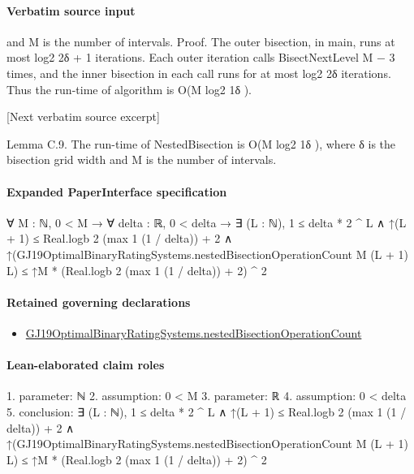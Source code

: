 \documentclass[10pt]{article}
\begin{document}
\paragraph{Verbatim source input}
\begin{ReviewVerbatim}
and M is the number of intervals.
Proof. The outer bisection, in main, runs at most log2 2δ + 1 iterations. Each outer iteration calls
BisectNextLevel M − 3 times, and the inner bisection in each call runs for at most log2 2δ iterations.
Thus the run-time of algorithm is O(M log2 1δ ).


[Next verbatim source excerpt]

Lemma C.9. The run-time of NestedBisection is O(M log2 1δ ), where δ is the bisection grid width
and M is the number of intervals.
\end{ReviewVerbatim}



\paragraph{Expanded PaperInterface specification}
\begin{ReviewVerbatim}
∀ {M : ℕ},
  0 < M →
    ∀ {delta : ℝ},
      0 < delta →
        ∃ (L : ℕ),
          1 ≤ delta * 2 ^ L ∧
            ↑(L + 1) ≤ Real.logb 2 (max 1 (1 / delta)) + 2 ∧
              ↑(GJ19OptimalBinaryRatingSystems.nestedBisectionOperationCount M (L + 1) L) ≤
                ↑M * (Real.logb 2 (max 1 (1 / delta)) + 2) ^ 2
\end{ReviewVerbatim}

\paragraph{Retained governing declarations}
\begin{itemize}\raggedright
\item \hyperlink{governing-declaration-f9ba8907108dde3e}{GJ19\allowbreak{}Optimal\allowbreak{}Binary\allowbreak{}Rating\allowbreak{}Systems.\allowbreak{}nested\allowbreak{}Bisection\allowbreak{}Operation\allowbreak{}Count}
\end{itemize}
\paragraph{Lean-elaborated claim roles}\begin{ReviewVerbatim}
1. parameter: ℕ
2. assumption: 0 < M
3. parameter: ℝ
4. assumption: 0 < delta
5. conclusion: ∃ (L : ℕ),
  1 ≤ delta * 2 ^ L ∧
    ↑(L + 1) ≤ Real.logb 2 (max 1 (1 / delta)) + 2 ∧
      ↑(GJ19OptimalBinaryRatingSystems.nestedBisectionOperationCount M (L + 1) L) ≤
        ↑M * (Real.logb 2 (max 1 (1 / delta)) + 2) ^ 2
\end{ReviewVerbatim}
\end{document}
